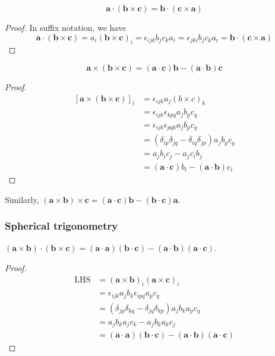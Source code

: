 \documentclass[a4paper]{article}
\begin{document}
\begin{prop}
  \[
    \mathbf{a\cdot (b\times c) = b\cdot(c\times a)}
  \]
\end{prop}
\begin{proof}
  In suffix notation, we have
  \[
    \mathbf{a\cdot (b\times c)} = a_i\mathbf{(b\times c)}_i = \epsilon_{ijk}b_jc_ka_i = \epsilon_{jki}b_jc_ka_i = \mathbf{b\cdot (c\times a)}
  \]
\end{proof}

\begin{thm}
  \[
    \mathbf{a\times (b\times c) = (a\cdot c)b - (a\cdot b)c}
  \]
\end{thm}
\begin{proof}
  \begin{align*}
    \mathbf{[a\times(b\times c)]}_i &= \epsilon_{ijk} a_j(b\times c)_k \\
    &= \epsilon_{ijk}\epsilon_{kpq}a_jb_pc_q\\
    &= \epsilon_{ijk}\epsilon_{pqk} a_jb_pc_q\\
    &= (\delta_{ip}\delta_{jq}-\delta_{iq}\delta_{jp})a_jb_pc_q\\
    &= a_jb_ic_j - a_jc_ib_j\\
    &= \mathbf{(a\cdot c)}b_i - \mathbf{(a\cdot b)}c_i
  \end{align*}
\end{proof}
Similarly, $\mathbf{(a\times b)\times c = (a\cdot c)b - (b\cdot c)a}$.

\subsubsection{Spherical trigonometry}
\begin{prop}
  $\mathbf{(a\times b)\cdot (b\times c) = (a\cdot a)(b\cdot c) - (a\cdot b)(a\cdot c)}$.
\end{prop}
\begin{proof}
  \begin{align*}
    \text{LHS} &= (\mathbf{a\times b})_i(\mathbf{a\times c})_i\\
    &= \epsilon_{ijk}a_jb_k\epsilon_{ipq} a_pc_q\\
    &= (\delta_{jp}\delta_{kq} - \delta_{jq}\delta_{kp})a_jb_ka_pc_q\\
    &= a_jb_k a_jc_k - a_j b_k a_k c_j\\
    &= \mathbf{(a\cdot a)(b\cdot c) - (a\cdot b)(a\cdot c)}
  \end{align*}
\end{proof}
\end{document}
